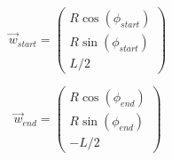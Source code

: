 \begin{equation}
  \vec{w}_{start} = \begin{pmatrix}
    R \cos(\phi_{start}) \\
    R \sin(\phi_{start}) \\
    L/2
  \end{pmatrix}
\end{equation}

\begin{equation}
  \vec{w}_{end} = \begin{pmatrix}
    R \cos(\phi_{end}) \\
    R \sin(\phi_{end}) \\
    -L/2
  \end{pmatrix}
\end{equation}
